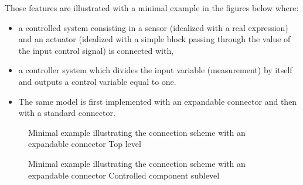 \documentclass[letterpaper,10pt, openany,english]{sphinxmanual}
\begin{document}
Those features are illustrated with a minimal example in the figures below where:
\begin{itemize}
\item {} 
a controlled system consisting in a sensor (idealized with a real expression) and an actuator (idealized with a simple block passing through the value of the input control signal) is connected with,

\item {} 
a controller system which divides the input variable (measurement) by itself and outputs a control variable equal to one.

\item {} 
The same model is first implemented with an expandable connector and then with a standard connector.

\end{itemize}

\begin{figure}[htbp]
\centering
\capstart

\noindent{}
\caption{Minimal example illustrating the connection scheme with an expandable connector \textendash{} Top level}\label{\detokenize{requirements:bustestexp}}\end{figure}

\begin{sphinxVerbatim}[commandchars=\\\{\}]
 
 
 
       
 
\end{sphinxVerbatim}

\begin{figure}[htbp]
\centering
\capstart

\noindent{}
\caption{Minimal example illustrating the connection scheme with an expandable connector \textendash{} Controlled component sublevel}\label{\detokenize{requirements:bustestcontrolledexp}}\end{figure}
\end{document}
